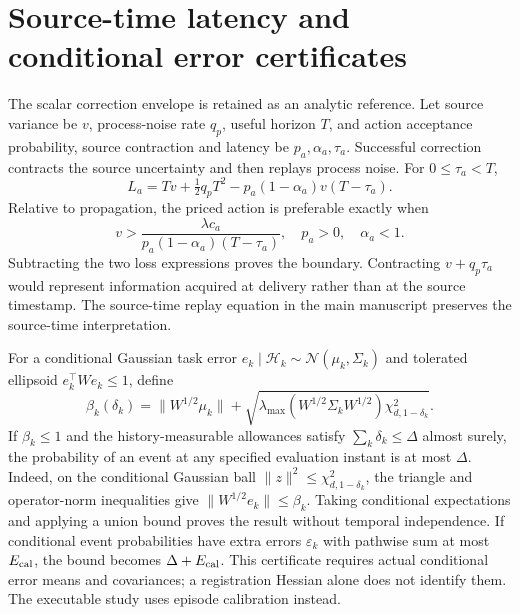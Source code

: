 \section{Source-time latency and conditional error certificates}\label{app:certificate}
The scalar correction envelope is retained as an analytic reference. Let source variance be $v$, process-noise rate $q_p$, useful horizon $T$, and action acceptance probability, source contraction and latency be $p_a,\alpha_a,\tau_a$. Successful correction contracts the source uncertainty and then replays process noise. For $0\le\tau_a<T$,
\begin{equation}
L_a=Tv+\tfrac12q_pT^2-p_a(1-\alpha_a)v(T-\tau_a).\label{eq:scalar-loss}
\end{equation}
Relative to propagation, the priced action is preferable exactly when
\begin{equation}
v>\frac{\lambda c_a}{p_a(1-\alpha_a)(T-\tau_a)},\quad p_a>0,\quad\alpha_a<1.\label{eq:scalar-boundary}
\end{equation}
Subtracting the two loss expressions proves the boundary. Contracting $v+q_p\tau_a$ would represent information acquired at delivery rather than at the source timestamp. The source-time replay equation in the main manuscript preserves the source-time interpretation.

For a conditional Gaussian task error $e_k\mid\mathcal H_k\sim\mathcal N(\mu_k,\Sigma_k)$ and tolerated ellipsoid $e_k^\top We_k\le1$, define
\begin{equation}
\beta_k(\delta_k)=\|W^{1/2}\mu_k\|+
\sqrt{\lambda_{\max}(W^{1/2}\Sigma_kW^{1/2})\chi^2_{d,1-\delta_k}}.\label{eq:gaussian-envelope}
\end{equation}
If $\beta_k\le1$ and the history-measurable allowances satisfy $\sum_k\delta_k\le\Delta$ almost surely, the probability of an event at any specified evaluation instant is at most $\Delta$. Indeed, on the conditional Gaussian ball $\|z\|^2\le\chi^2_{d,1-\delta_k}$, the triangle and operator-norm inequalities give $\|W^{1/2}e_k\|\le\beta_k$. Taking conditional expectations and applying a union bound proves the result without temporal independence. If conditional event probabilities have extra errors $\varepsilon_k$ with pathwise sum at most $E_{\rm cal}$, the bound becomes $\Delta+E_{\rm cal}$. This certificate requires actual conditional error means and covariances; a registration Hessian alone does not identify them. The executable study uses episode calibration instead.

